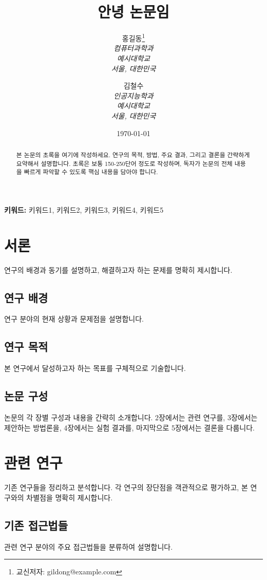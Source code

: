 \documentclass[12pt,a4paper]{article}
\title{안녕 논문임}
\author{
    홍길동\thanks{교신저자: gildong@example.com} \\
    \textit{컴퓨터과학과} \\
    \textit{예시대학교} \\
    \textit{서울, 대한민국}
    \and
    김철수 \\
    \textit{인공지능학과} \\
    \textit{예시대학교} \\
    \textit{서울, 대한민국}
}
\date{\today}
\begin{document}
\maketitle

\begin{abstract}
본 논문의 초록을 여기에 작성하세요. 연구의 목적, 방법, 주요 결과, 그리고 결론을 간략하게 요약해서 설명합니다. 초록은 보통 150-250단어 정도로 작성하며, 독자가 논문의 전체 내용을 빠르게 파악할 수 있도록 핵심 내용을 담아야 합니다.
\end{abstract}

\textbf{키워드:} 키워드1, 키워드2, 키워드3, 키워드4, 키워드5

\section{서론}
\label{sec:introduction}

연구의 배경과 동기를 설명하고, 해결하고자 하는 문제를 명확히 제시합니다. 

\subsection{연구 배경}
연구 분야의 현재 상황과 문제점을 설명합니다.

\subsection{연구 목적}
본 연구에서 달성하고자 하는 목표를 구체적으로 기술합니다.

\subsection{논문 구성}
논문의 각 장별 구성과 내용을 간략히 소개합니다. 2장에서는 관련 연구를, 3장에서는 제안하는 방법론을, 4장에서는 실험 결과를, 마지막으로 5장에서는 결론을 다룹니다.

\section{관련 연구}
\label{sec:related_work}

기존 연구들을 정리하고 분석합니다. 각 연구의 장단점을 객관적으로 평가하고, 본 연구와의 차별점을 명확히 제시합니다.

\subsection{기존 접근법들}
관련 연구 분야의 주요 접근법들을 분류하여 설명합니다.
\end{document}
